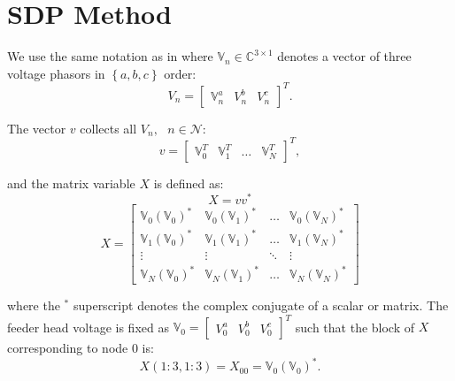 \section{SDP Method}

We use the same notation as in \cite{dall2012optimization} where $\mathbb{V}_{n} \in \mathbb{C}^{3 \times 1}$ denotes a vector of three voltage phasors in $\left\{ a,b,c \right\}$ order:
\begin{equation}
	V_{n} = 
    \begin{bmatrix}
    	\mathbb{V}_{n}^{a} & V_{n}^{b} & V_{n}^{c}
    \end{bmatrix}^{T}.
\end{equation}

\noindent The vector $v$ collects all $V_{n}, \text{ } n \in \mathcal{N}$:
\begin{equation}
    v = 
    \begin{bmatrix}
    	\mathbb{V}_{0}^{T} & \mathbb{V}_{1}^{T} & \hdots & \mathbb{V}_{N}^{T}
    \end{bmatrix}^{T},
\end{equation}

\noindent and the matrix variable $X$ is defined as:
\begin{equation}
    X = v v^{*}
\end{equation}
\begin{equation}
    X =
    \begin{bmatrix}
    	\mathbb{V}_{0} \left( \mathbb{V}_{0} \right)^{*} & \mathbb{V}_{0} \left( \mathbb{V}_{1} \right)^{*} & \hdots & \mathbb{V}_{0} \left( \mathbb{V}_{N} \right)^{*} \\
        \mathbb{V}_{1} \left( \mathbb{V}_{0} \right)^{*} & \mathbb{V}_{1} \left( \mathbb{V}_{1} \right)^{*} & \hdots & \mathbb{V}_{1} \left( \mathbb{V}_{N} \right)^{*} \\
        \vdots & \vdots & \ddots & \vdots \\
        \mathbb{V}_{N} \left( \mathbb{V}_{0} \right)^{*} & \mathbb{V}_{N} \left( \mathbb{V}_{1} \right)^{*} & \hdots & \mathbb{V}_{N} \left( \mathbb{V}_{N} \right)^{*}
    \end{bmatrix}
\end{equation}

\noindent where the ${}^{*}$ superscript denotes the complex conjugate of a scalar or matrix. The feeder head voltage is fixed as
$\mathbb{V}_{0} = \begin{bmatrix} V_{0}^{a} & V_{0}^{b} & V_{0}^{c} \end{bmatrix}^{T}$
such that the block of $X$ corresponding to node $0$ is:
\begin{equation}
    X(1:3,1:3) = X_{00} = 
	\mathbb{V}_{0} \left( \mathbb{V}_{0}  \right)^{*}.
\end{equation}

